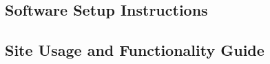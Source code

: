 \documentclass[12pt]{article}
\begin{document}
\subsection{Software Setup Instructions}


\subsection{Site Usage and Functionality Guide}




\newpage



\end{document}
